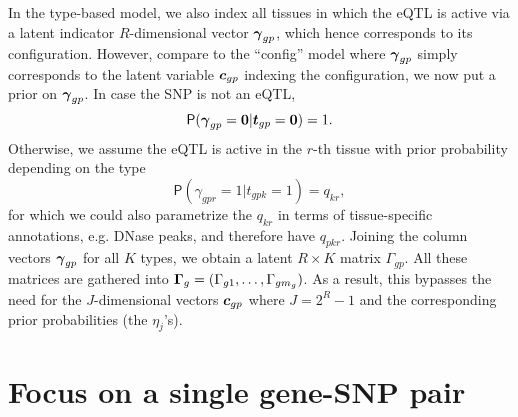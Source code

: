\documentclass[10pt]{article}
\newcommand{\Prd}{\mathsf{P}} %
\newcommand{\cv}{\mbox{\boldmath$c$}}
\newcommand{\tv}{\mbox{\boldmath$t$}}
\newcommand{\gav}{\mbox{\boldmath$\gamma$}}
\newcommand{\Gav}{\mbox{\boldmath$\Gamma$}}
\begin{document}
In the type-based model, we also index all tissues in which the eQTL is active via a latent indicator $R$-dimensional vector $\gav_{gp}$, which hence corresponds to its configuration.
However, compare to the ``config'' model where $\gav_{gp}$ simply corresponds to the latent variable $\cv_{gp}$ indexing the configuration, we now put a prior on $\gav_{gp}$.
In case the SNP is not an eQTL,
\begin{equation}
  \Prd(\gav_{gp} = \bm{0}  | \tv_{gp} = \bm{0}) = 1.
\end{equation}
Otherwise, we assume the eQTL is active in the $r$-th tissue with prior probability depending on the type
\begin{equation}
  \Prd(\gamma_{gpr} = 1 | t_{gpk} = 1) = q_{kr},
\end{equation}
for which we could also parametrize the $q_{kr}$ in terms of tissue-specific annotations, e.g. DNase peaks, and therefore have $q_{pkr}$.
Joining the column vectors $\gav_{gp}$ for all $K$ types, we obtain a latent $R \times K$ matrix $\Gamma_{gp}$.
All these matrices are gathered into $\Gav_g = (\Gamma_{g1},\ldots,\Gamma_{gm_g})$.
As a result, this bypasses the need for the $J$-dimensional vectors $\cv_{gp}$ where $J=2^R-1$ and the corresponding prior probabilities (the $\eta_j$'s).




\section{Focus on a single gene-SNP pair}
\end{document}

